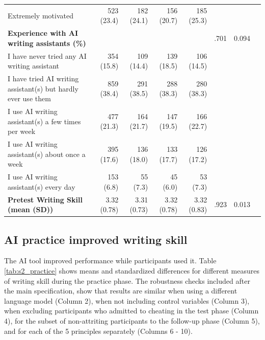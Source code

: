 \documentclass[11pt]{report}
\begin{document}
\begin{append}
\begin{table}[h]
\begin{tabular}{lrrrrrrr}
       \hspace{1em}Extremely motivated &  523 (23.4)  &  182 (24.1)  &  156 (20.7)  &  185 (25.3)  &  &    \\ 
    \textbf{Experience with AI writing assistants (\%)} &  &   &   &   & .701   &  0.094 \\ 
       \hspace{1em}I have never tried any AI writing assistant &  354 (15.8)  &  109 (14.4)  &  139 (18.5)  &  106 (14.5)  &    &  \\ 
       \hspace{1em}I have tried AI writing assistant(s) but hardly ever use them &  859 (38.4)  &  291 (38.5)  &  288 (38.3)  &  280 (38.3)  &  &    \\ 
       \hspace{1em}I use AI writing assistant(s) a few times per week &  477 (21.3)  &  164 (21.7)  &  147 (19.5)  &  166 (22.7)  &  &    \\ 
       \hspace{1em}I use AI writing assistant(s) about once a week &  395 (17.6)  &  136 (18.0)  &  133 (17.7)  &  126 (17.2)  &  &    \\ 
       \hspace{1em}I use AI writing assistant(s) every day &  153 (6.8)  &   55 (7.3)  &   45 (6.0)  &   53 (7.3)  &  &    \\ 
    \textbf{Pretest Writing Skill (mean (SD))} & 3.32 (0.78) & 3.31 (0.73) & 3.32 (0.78) & 3.32 (0.83) & .923 &    0.013 \\ 
    \bottomrule
    \end{tabular}
    \end{table}
\FloatBarrier
\subsection{AI practice improved writing skill}

The AI tool improved performance while participants used it. Table \ref{tab:s2_practice} shows means and standardized differences for different measures of writing skill during the practice phase. The robustness checks included after the main specification, show that results are similar when using a different language model (Column 2), when not including control variables (Column 3), when excluding participants who admitted to cheating in the test phase (Column 4), for the subset of non-attriting participants to the follow-up phase (Column 5), and for each of the 5 principles separately (Columns 6 - 10).


\end{append}
\end{document}
